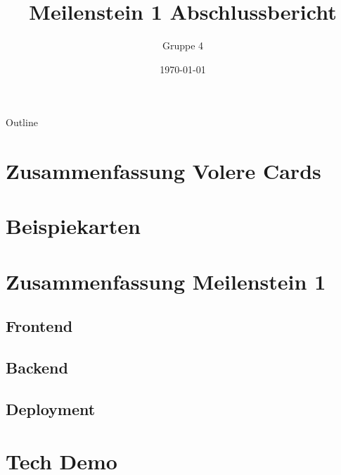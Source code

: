 \documentclass{beamer}
\title{Meilenstein 1 Abschlussbericht}
\author{Gruppe 4}
\date{\today}
\institute{TU Chemnitz}
\begin{document}
\begin{titlepage}

\end{titlepage}

\begin{frame}{Outline}
    \tableofcontents
\end{frame}

\section{Zusammenfassung Volere Cards}
\begin{frame}
    
\end{frame}
\section{Beispiekarten}
\section{Zusammenfassung Meilenstein 1}
\subsection{Frontend}
\subsection{Backend}
\subsection{Deployment}
\section{Tech Demo}
\end{document}
